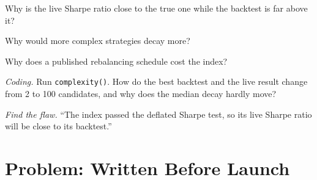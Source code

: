 \begin{exercise}[$\star\star$]\label{exo:s2:quantitative-investment-strategies:4}
Why is the live Sharpe ratio close to the true one while the backtest is far above it?
\end{exercise}

\begin{exercise}[$\star\star$]\label{exo:s2:quantitative-investment-strategies:5}
Why would more complex strategies decay more?
\end{exercise}

\begin{exercise}[$\star\star$]\label{exo:s2:quantitative-investment-strategies:6}
Why does a published rebalancing schedule cost the index?
\end{exercise}

\begin{exercise}[$\star\star\star$]\label{exo:s2:quantitative-investment-strategies:7}
\emph{Coding.} Run \texttt{complexity()}. How do the best backtest and the live result change from 2 to 100 candidates, and why does the median
decay hardly move?
\end{exercise}

\begin{exercise}[$\star\star\star$]\label{exo:s2:quantitative-investment-strategies:8}
\emph{Find the flaw.} ``The index passed the deflated Sharpe test, so its live Sharpe ratio will be close to its backtest.''
\end{exercise}

\section{Problem: Written Before Launch}

